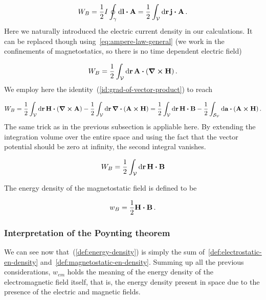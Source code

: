 \documentclass[12pt, class=report, crop=false]{standalone}
\begin{document}
\begin{equation*}
  W_{B} = \frac{1}{2} I \oint_{\gamma} \dd{\vb{l}}\vdot \vb{A} = \frac{1}{2} \int_\mathcal{V} \dd{\vb{r}} \vb{j}\vdot\vb{A} \,.
\end{equation*}
Here we naturally introduced the electric current density in our calculations. It can be replaced though using~\cref{eq:ampere-law-general} (we work in the confinements of magnetostatics, so there is no time dependent electric field)

\begin{equation*}
  W_{B} = \frac{1}{2} \int_\mathcal{V} \dd{\vb{r}} \vb{A}\vdot (\curl{\vb{H}}) \,.
\end{equation*}
We employ here the identity~(\ref{id:grad-of-vector-product}) to reach

\begin{equation*}
  W_{B} = \frac{1}{2} \int_\mathcal{V} \dd{\vb{r}} \vb{H}\vdot (\curl{\vb{A}}) - \frac{1}{2} \int_\mathcal{V} \dd{\vb{r}} \div{(\vb{A}\cp\vb{H})} = \frac{1}{2} \int_\mathcal{V} \dd{\vb{r}} \vb{H}\vdot \vb{B} - \frac{1}{2} \int_{\mathcal{S}_\mathcal{V}} \dd{\vb{a}} \vdot (\vb{A}\cp\vb{H}) \,.
\end{equation*}
The same trick as in the previous subsection is appliable here. By extending the integration volume over the entire space and using the fact that the vector potential should be zero at infinity, the second integral vanishes.

\begin{equation}
  W_{B} = \frac{1}{2} \int_\mathcal{V} \dd{\vb{r}} \vb{H}\vdot \vb{B}
\end{equation}

\par
The energy density of the magnetostatic field is defined to be

\begin{equation}
  \label{def:magnetostatic-en-density}
  w_{B} = \frac{1}{2} \vb{H}\vdot\vb{B} \,.
\end{equation}

\subsubsection{Interpretation of the Poynting theorem}

We can see now that~(\ref{def:energy-density}) is simply the sum of~\cref{def:electrostatic-en-density} and~\cref{def:magnetostatic-en-density}. Summing up all the previous considerations, \(w_{em}\) holds the meaning of the energy density of the electromagnetic field itself, that is, the energy density present in space due to the presence of the electric and magnetic fields.
\end{document}
